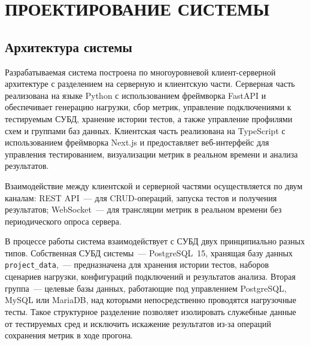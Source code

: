 \section{ПРОЕКТИРОВАНИЕ СИСТЕМЫ}

\subsection{Архитектура системы}

Разрабатываемая система построена по многоуровневой клиент-серверной архитектуре с разделением на серверную и клиентскую части. Серверная часть реализована на языке Python с использованием фреймворка FastAPI и обеспечивает генерацию нагрузки, сбор метрик, управление подключениями к тестируемым СУБД, хранение истории тестов, а также управление профилями схем и группами баз данных. Клиентская часть реализована на TypeScript с использованием фреймворка Next.js и предоставляет веб-интерфейс для управления тестированием, визуализации метрик в реальном времени и анализа результатов.

Взаимодействие между клиентской и серверной частями осуществляется по двум каналам: REST API~--- для CRUD-операций, запуска тестов и получения результатов; WebSocket~--- для трансляции метрик в реальном времени без периодического опроса сервера.

В процессе работы система взаимодействует с СУБД двух принципиально разных типов. Собственная СУБД системы~--- PostgreSQL~15, хранящая базу данных \texttt{project\_data},~--- предназначена для хранения истории тестов, наборов сценариев нагрузки, конфигураций подключений и результатов анализа. Вторая группа~--- целевые базы данных, работающие под управлением PostgreSQL, MySQL или MariaDB, над которыми непосредственно проводятся нагрузочные тесты. Такое структурное разделение позволяет изолировать служебные данные от тестируемых сред и исключить искажение результатов из-за операций сохранения метрик в ходе прогона.

